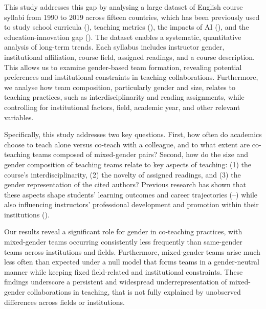 \documentclass[
  12pt,
]{article}
\begin{document}
This study addresses this gap by analysing a large dataset of English course syllabi from 1990 to 2019 across fifteen countries, which has been previously used to study school curricula (), teaching metrics (), the impacts of AI (), and the education-innovation gap (). The dataset enables a systematic, quantitative analysis of long-term trends. Each syllabus includes instructor gender, institutional affiliation, course field, assigned readings, and a course description. This allows us to examine gender-based team formation, revealing potential preferences and institutional constraints in teaching collaborations. Furthermore, we analyse how team composition, particularly gender and size, relates to teaching practices, such as interdisciplinarity and reading assignments, while controlling for institutional factors, field, academic year, and other relevant variables.

Specifically, this study addresses two key questions. First, how often do academics choose to teach alone versus co-teach with a colleague, and to what extent are co-teaching teams composed of mixed-gender pairs? Second, how do the size and gender composition of teaching teams relate to key aspects of teaching: (1) the course's interdisciplinarity, (2) the novelty of assigned readings, and (3) the gender representation of the cited authors? Previous research has shown that these aspects shape students' learning outcomes and career trajectories (--) while also influencing instructors' professional development and promotion within their institutions ().

Our results reveal a significant role for gender in co-teaching practices, with mixed-gender teams occurring consistently less frequently than same-gender teams across institutions and fields. Furthermore, mixed-gender teams arise much less often than expected under a null model that forms teams in a gender-neutral manner while keeping fixed field-related and institutional constraints. These findings underscore a persistent and widespread underrepresentation of mixed-gender collaborations in teaching, that is not fully explained by unobserved differences across fields or institutions.
\end{document}
